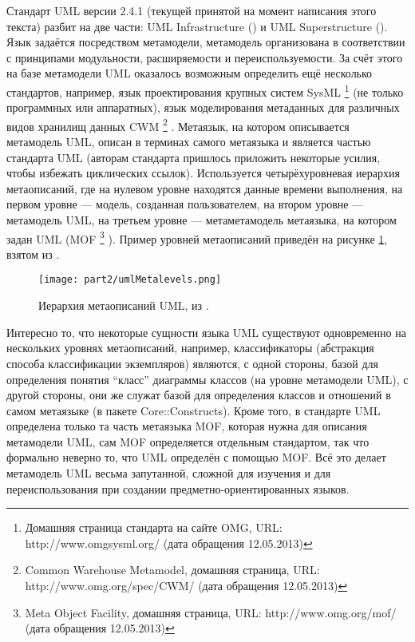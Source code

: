 Стандарт UML версии 2.4.1 (текущей принятой на момент написания этого текста) разбит 
на две части: UML Infrastructure (\cite{omg2011infrastructure}) и UML Superstructure 
(\cite{omg2011superstructure}). Язык задаётся посредством метамодели, метамодель организована 
в соответствии с принципами модульности, расширяемости и переиспользуемости. За счёт 
этого на базе метамодели UML оказалось возможным определить ещё несколько стандартов, например, язык проектирования крупных систем SysML
\footnote{Домашняя страница стандарта на сайте OMG, URL: http://www.omgsysml.org/ (дата обращения 12.05.2013)}
(не только программных или аппаратных), язык моделирования метаданных для различных видов хранилищ данных CWM
\footnote{Common Warehouse Metamodel, домашняя страница, URL: http://www.omg.org/spec/CWM/ (дата обращения 12.05.2013)}
. Метаязык, на котором описывается метамодель UML, описан в терминах самого метаязыка и является 
частью стандарта UML (авторам стандарта пришлось приложить некоторые усилия, чтобы 
избежать циклических ссылок). Используется четырёхуровневая иерархия метаописаний, 
где на нулевом уровне находятся данные времени выполнения, на первом уровне --- модель, 
созданная пользователем, на втором уровне --- метамодель UML, на третьем уровне --- метаметамодель метаязыка, на котором задан UML (MOF
\footnote{Meta Object Facility, домашняя страница, URL: http://www.omg.org/mof/ (дата обращения 12.05.2013)}
). Пример уровней метаописаний приведён на рисунке \ref{umlMetalevels}, взятом из \cite{omg2011infrastructure}.

\begin{figure} [ht]
	\begin{center}
		\texttt{[image: part2/umlMetalevels.png]}
		\caption{Иерархия метаописаний UML, из \cite{omg2011infrastructure}.}
		\label{umlMetalevels}
	\end{center}
\end{figure}

Интересно то, что некоторые сущности языка UML существуют одновременно на нескольких 
уровнях метаописаний, например, классификаторы (абстракция способа классификации экземпляров) 
являются, с одной стороны, базой для определения понятия "`класс"' диаграммы классов 
(на уровне метамодели UML), с другой стороны, они же служат базой для определения 
классов и отношений в самом метаязыке (в пакете Core::Constructs). Кроме того, в стандарте 
UML определена только та часть метаязыка MOF, которая нужна для описания метамодели UML, 
сам MOF определяется отдельным стандартом, так что формально неверно то, что UML определён 
с помощью MOF. Всё это делает метамодель UML весьма запутанной, сложной для изучения 
и для переиспользования при создании предметно-ориентированных языков. 

